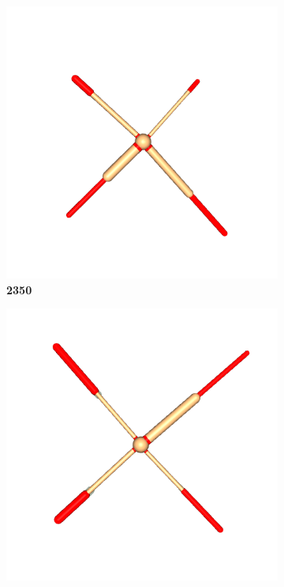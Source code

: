 \begin{figure}[!ht]
            \begin{subfigure}{\textwidth}
                \centering
                \begin{minipage}{0.19\textwidth}
                    \centering
                    \includegraphics[width=\linewidth]{resources/generalist_2_2350/ant.png}
                    \textbf{2350}
                \end{minipage}
                \hfill
                \begin{minipage}{0.19\textwidth}
                    \centering
                    \includegraphics[width=\linewidth]{resources/generalist_3_2412/ant.png}

\end{minipage}
\end{subfigure}
\end{figure}
